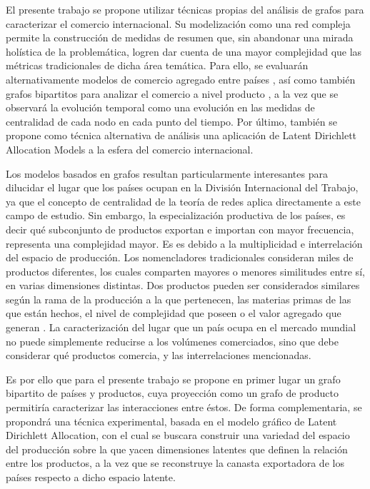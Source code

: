 \documentclass[runningheads,a4paper]{llncs}
\begin{document}
El presente trabajo se propone utilizar técnicas propias del análisis de grafos para caracterizar el comercio internacional. Su modelización como una red compleja permite la construcción de medidas de resumen que, sin abandonar una mirada holística de la problemática, logren dar cuenta de una mayor complejidad que las métricas tradicionales de dicha área temática. Para ello, se evaluarán alternativamente modelos de comercio agregado entre países \citep{Fagiolo2007}, así como también grafos bipartitos para analizar el comercio a nivel producto \citep{Hidalgo2007}, a la vez que se observará la evolución temporal como una evolución en las medidas de centralidad de cada nodo en cada punto del tiempo.
Por último, también se propone como técnica alternativa de análisis una aplicación de Latent Dirichlett Allocation Models \citep{LDA} a la esfera del comercio internacional. 

Los modelos basados en grafos resultan particularmente interesantes para dilucidar el lugar que los países ocupan en la División Internacional del Trabajo, ya que el concepto de centralidad de la teoría de redes aplica directamente a este campo de estudio. Sin embargo, la especialización productiva de los países, es decir qué subconjunto de productos exportan e importan con mayor frecuencia, representa una complejidad mayor. Es es debido a la multiplicidad e interrelación del espacio de producción. Los nomencladores tradicionales consideran miles de productos diferentes, los cuales comparten mayores o menores similitudes entre sí, en varias dimensiones distintas. Dos productos pueden ser considerados similares según la rama de la producción a la que pertenecen, las materias primas de las que están hechos, el nivel de complejidad que poseen o el valor agregado que generan \citep{molinari2016especializacion}. La caracterización del lugar que un país ocupa en el mercado mundial no puede simplemente reducirse a los volúmenes comerciados, sino que debe considerar qué productos comercia, y las interrelaciones mencionadas. 

Es por ello que para el presente trabajo se propone en primer lugar un grafo bipartito de países y productos, cuya proyección como un grafo de producto permitiría caracterizar las interacciones entre éstos. De forma complementaria, se propondrá una técnica experimental, basada en el modelo gráfico de Latent Dirichlett Allocation, con el cual se buscara construir una variedad del espacio del producción sobre la que yacen dimensiones latentes que definen la relación entre los productos, a la vez que se reconstruye la canasta exportadora de los países respecto a dicho espacio latente. 
\end{document}
